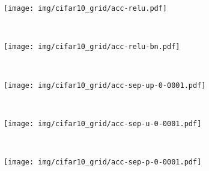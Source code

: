 \begin{figure*}
  \centering
    \begin{subfigure}[b]{0.3\textwidth}
        \texttt{[image: img/cifar10\_grid/acc-relu.pdf]}
        \caption{\ReLU}
        \label{fig:cifar10_grid_relu}
    \end{subfigure}
    ~ %
    \centering
    \begin{subfigure}[b]{0.3\textwidth}
        \texttt{[image: img/cifar10\_grid/acc-relu-bn.pdf]}
        \caption{\ReLUBN}
        \label{fig:cifar10_grid_relubn}
    \end{subfigure}
    ~ %
    \centering
    \begin{subfigure}[b]{0.3\textwidth}
        \texttt{[image: img/cifar10\_grid/acc-sep-up-0-0001.pdf]}
        \caption{\SepUnitPoint}
        \label{fig:cifar10_grid_up}
    \end{subfigure}
    ~ %
    \\
    \begin{subfigure}[b]{0.3\textwidth}
        \texttt{[image: img/cifar10\_grid/acc-sep-u-0-0001.pdf]}
        \caption{\SepUnit}
        \label{fig:cifar10_grid_u}
    \end{subfigure}
    ~ %
    \centering
    \begin{subfigure}[b]{0.3\textwidth}
        \texttt{[image: img/cifar10\_grid/acc-sep-p-0-0001.pdf]}
        \caption{\SepPoint}
        \label{fig:cifar10_grid_p}
    \end{subfigure}
    ~ %


\end{figure*}
